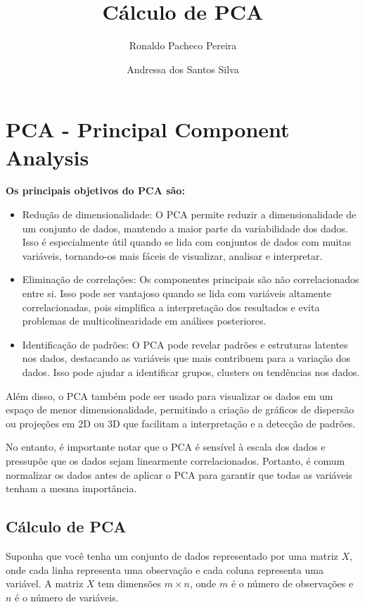\documentclass[12pt, a4paper]{article}
\title{Cálculo de PCA}
\author{Ronaldo Pacheco Pereira
\and Andressa dos Santos Silva}
\begin{document}
\maketitle

\section{PCA - Principal Component Analysis}


\textbf{Os principais objetivos do PCA são:}\\
\begin{itemize}
\item Redução de dimensionalidade: O PCA permite reduzir a dimensionalidade de um conjunto de dados, mantendo a maior parte da variabilidade dos dados. Isso é especialmente útil quando se lida com conjuntos de dados com muitas variáveis, tornando-os mais fáceis de visualizar, analisar e interpretar.

\item Eliminação de correlações: Os componentes principais são não correlacionados entre si. Isso pode ser vantajoso quando se lida com variáveis altamente correlacionadas, pois simplifica a interpretação dos resultados e evita problemas de multicolinearidade em análises posteriores.

\item Identificação de padrões: O PCA pode revelar padrões e estruturas latentes nos dados, destacando as variáveis que mais contribuem para a variação dos dados. Isso pode ajudar a identificar grupos, clusters ou tendências nos dados.
\end{itemize}
Além disso, o PCA também pode ser usado para visualizar os dados em um espaço de menor dimensionalidade, permitindo a criação de gráficos de dispersão ou projeções em 2D ou 3D que facilitam a interpretação e a detecção de padrões.

No entanto, é importante notar que o PCA é sensível à escala dos dados e pressupõe que os dados sejam linearmente correlacionados. Portanto, é comum normalizar os dados antes de aplicar o PCA para garantir que todas as variáveis tenham a mesma importância.

\subsection{Cálculo de PCA}

Suponha que você tenha um conjunto de dados representado por uma matriz $X$, onde cada linha representa uma observação e cada coluna representa uma variável. A matriz $X$ tem dimensões $m \times n$, onde $m$ é o número de observações e $n$ é o número de variáveis.
\end{document}
